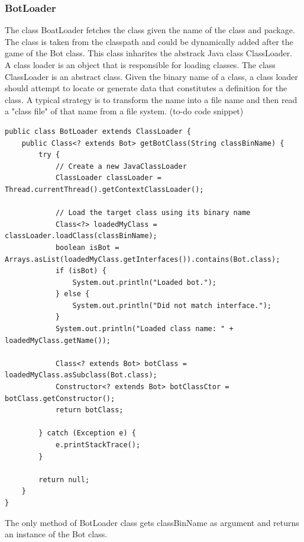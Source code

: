 \documentclass[a4paper,12pt]{article}
\begin{document}
\subsubsection{BotLoader}
The class BoatLoader fetches the class given the name  of the class and package. The class is taken from the classpath and could be dynamically added after the game of the Bot class. This class inharites the abstrack Java class ClassLoader.\\
A class loader is an object that is responsible for loading classes. The class ClassLoader is an abstract class. Given the binary name of a class, a class loader should attempt to locate or generate data that constitutes a definition for the class. A typical strategy is to transform the name into a file name and then read a "class file" of that name from a file system.%
(to-do code snippet)
\begin{verbatim}
public class BotLoader extends ClassLoader {
    public Class<? extends Bot> getBotClass(String classBinName) {
        try {
            // Create a new JavaClassLoader
            ClassLoader classLoader = Thread.currentThread().getContextClassLoader();

            // Load the target class using its binary name
            Class<?> loadedMyClass = classLoader.loadClass(classBinName);
            boolean isBot = Arrays.asList(loadedMyClass.getInterfaces()).contains(Bot.class);
            if (isBot) {
                System.out.println("Loaded bot.");
            } else {
                System.out.println("Did not match interface.");
            }
            System.out.println("Loaded class name: " + loadedMyClass.getName());

            Class<? extends Bot> botClass = loadedMyClass.asSubclass(Bot.class);
            Constructor<? extends Bot> botClassCtor = botClass.getConstructor();
            return botClass;

        } catch (Exception e) {
            e.printStackTrace();
        }

        return null;
    }
}

\end{verbatim}
\newpage
The only method of BotLoader class gets classBinName as argument and returns an instance of the Bot class.
\end{document}

